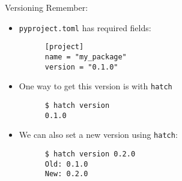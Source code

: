 \begin{darkframe}{Versioning}
  Remember:
  \begin{itemize}
    \item \texttt{pyproject.toml} has required fields:
    \begin{verbatim}
      [project]
      name = "my_package"
      version = "0.1.0"
    \end{verbatim}
    \item One way to get this version is with \texttt{hatch}
    \begin{verbatim}
      $ hatch version
      0.1.0
    \end{verbatim}
    \item We can also set a new version using \texttt{hatch}:
    \begin{verbatim}
      $ hatch version 0.2.0
      Old: 0.1.0
      New: 0.2.0
    \end{verbatim}
  \end{itemize}
\end{darkframe}

\begin{darkframe}{}
\end{darkframe}


